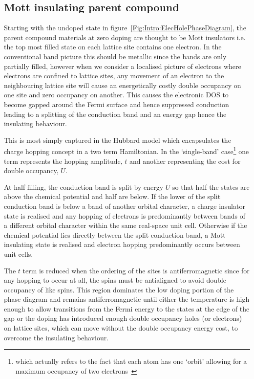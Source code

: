 \subsection{Mott insulating parent compound}

Starting with the undoped state in figure~\ref{Fig:Intro:ElecHolePhaseDiagram}, the parent compound materials at zero doping are thought to be Mott insulators i.e. the top most filled state on each lattice site contains one electron. In the conventional band picture this should be metallic since the bands are only partially filled, however when we consider a localised picture of electrons where electrons are confined to lattice sites, any movement of an electron to the neighbouring lattice site will cause an energetically costly double occupancy on one site and zero occupancy on another. This causes the electronic \ac{DOS} to become gapped around the Fermi surface and hence suppressed conduction leading to a splitting of the conduction band and an energy gap hence the insulating behaviour.

This is most simply captured in the Hubbard model which encapsulates the charge hopping concept in a two term Hamiltonian. In the `single-band' case\footnote{which actually refers to the fact that each atom has one `orbit' allowing for a maximum occupancy of two electrons~\cite{Tasaki1998}} one term represents the hopping amplitude, $t$ and another representing the cost for double occupancy, $U$.  

At half filling, the conduction band is split by energy $U$ so that half the states are above the chemical potential and half are below. If the lower of the split conduction band is below a band of another orbital character, a charge insulator state is realised and any hopping of electrons is predominantly between bands of a different orbital character within the same real-space unit cell. Otherwise if the chemical potential lies directly between the split conduction band, a Mott insulating state is realised and electron hopping predominantly occurs between unit cells.

The $t$ term is reduced when the ordering of the sites is antiferromagnetic since for any hopping to occur at all, the spins must be antialigned to avoid double occupancy of like spins. This region dominates the low doping portion of the phase diagram and remains antiferromagnetic until either the temperature is high enough to allow transitions from the Fermi energy to the states at the edge of the gap or the doping has introduced enough double occupancy holes (or electrons) on lattice sites, which can move without the double occupancy energy cost, to overcome the insulating behaviour.

